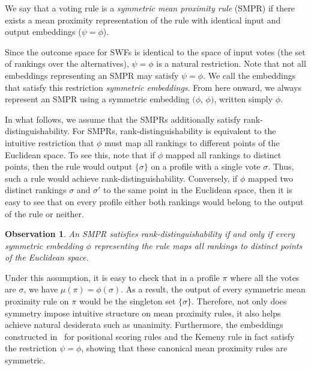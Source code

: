 \documentclass[prodmode]{acmsmall-ec14}
\newtheorem{observation}[theorem]{Observation}
\begin{document}
\begin{definition}
We say that a voting rule is a \emph{symmetric mean proximity rule} (SMPR) if there exists a mean proximity representation of the rule with identical input and output embeddings ($\psi = \phi$). 
\end{definition} 
%
Since the outcome space for SWFs is identical to the space of input votes (the set of rankings over the alternatives), $\psi = \phi$ is a natural restriction. Note that not all embeddings representing an SMPR may satisfy $\psi = \phi$. We call the embeddings that satisfy this restriction \emph{symmetric embeddings}. From here onward, we always represent an SMPR using a symmetric embedding $(\phi$, $\phi)$, written simply $\phi$.

In what follows, we assume that the SMPRs additionally satisfy rank-distinguishability. For SMPRs, rank-distinguishability is equivalent to the intuitive restriction that $\phi$ must map all rankings to different points of the Euclidean space. To see this, note that if $\phi$ mapped all rankings to distinct points, then the rule would output $\{\sigma\}$ on a profile with a single vote $\sigma$. Thus, such a rule would achieve rank-distinguishability. Conversely, if $\phi$ mapped two distinct rankings $\sigma$ and $\sigma'$ to the same point in the Euclidean space, then it is easy to see that on every profile either both rankings would belong to the output of the rule or neither. 


\begin{observation}
An SMPR satisfies rank-distinguishability if and only if every symmetric embedding $\phi$ representing the rule maps all rankings to distinct points of the Euclidean space.
\end{observation}
%
Under this assumption, it is easy to check that in a profile $\pi$ where all the votes are $\sigma$, we have $\mu(\pi) = \phi(\sigma)$. As a result, the output of every symmetric mean proximity rule on $\pi$ would be the singleton set $\{\sigma\}$. Therefore, not only does symmetry impose intuitive structure on mean proximity rules, it also helps achieve natural desiderata such as unanimity. Furthermore, the embeddings constructed in~\cite{Zwicker08a} for positional scoring rules and the Kemeny rule in fact satisfy the restriction $\psi = \phi$, showing that these canonical mean proximity rules are symmetric. 
\end{document}
